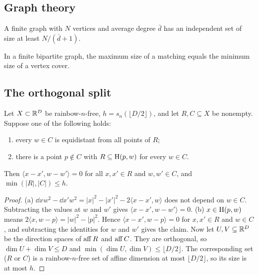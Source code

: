 \subsection{Graph theory}

\begin{theorem}\label{thm:CW}
A finite graph with $N$ vertices and average degree $\bar d$ has an independent set of size at least
$N/(\bar d+1)$.
\end{theorem}

\begin{theorem}\label{thm:Konig}
In a finite bipartite graph, the maximum size of a matching equals the minimum size of a vertex cover.
\end{theorem}

\subsection{The orthogonal split}

\begin{lemma}\label{lem:OR}
Let $X\subset\mathbb{R}^D$ be rainbow-$n$-free, $h=s_n(\lfloor D/2\rfloor)$, and let $R,C\subseteq X$ be nonempty.
Suppose one of the following holds:
\begin{enumerate}[label=(\alph*)]
\item every $w\in C$ is equidistant from all points of $R$;
\item there is a point $p\notin C$ with $R\subseteq\mathrm{H}(p,w)$ for every $w\in C$.
\end{enumerate}
Then $\langle x-x',w-w'\rangle=0$ for all $x,x'\in R$ and $w,w'\in C$, and $\min(|R|,|C|)\le h$.
\end{lemma}
\begin{proof}
(a) $\dd xw^2-\dd{x'}w^2=|x|^2-|x'|^2-2\langle x-x',w\rangle$ does not depend on $w\in C$. Subtracting the
values at $w$ and $w'$ gives $\langle x-x',w-w'\rangle=0$. (b) $x\in\mathrm{H}(p,w)$ means
$2\langle x,w-p\rangle=|w|^2-|p|^2$. Hence $\langle x-x',w-p\rangle=0$ for $x,x'\in R$ and $w\in C$, and
subtracting the identities for $w$ and $w'$ gives the claim.
Now let $U,V\subseteq\mathbb{R}^D$ be the direction spaces of $\operatorname{aff} R$ and $\operatorname{aff} C$. They are orthogonal, so
$\dim U+\dim V\le D$ and $\min(\dim U,\dim V)\le\lfloor D/2\rfloor$. The corresponding set ($R$ or $C$) is a
rainbow-$n$-free set of affine dimension at most $\lfloor D/2\rfloor$, so its size is at most $h$.
\end{proof}

